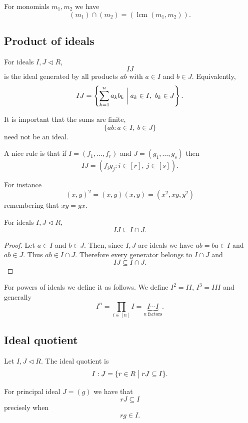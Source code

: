 \documentclass[11pt]{article}
\begin{document}
For monomials $m_1,m_2$ we have 
\[
    (m_1) \cap (m_2) = (\operatorname{lcm}(m_1,m_2)). 
\]

\subsection{Product of ideals}

\begin{defn}
    For ideals $I,J \triangleleft R$, 
    \[
        IJ
    \]
    is the ideal generated by all products $ab$ with $a \in I$ 
    and $b \in J$. 
    Equivalently, 
    \[
        IJ
        = 
        \left\{
            \sum_{k=1}^n a_kb_k \biggm| a_k \in I, \ b_k \in J
        \right\}.
    \]  
\end{defn}
It is important that the sums are finite, 
\[
    \{ab : a \in I, \ b \in J\}
\]
need not be an ideal. 

A nice rule is that if $I = (f_1,\ldots,f_r)$ and 
$J = (g_1,\ldots,g_s)$ then 
\[
    IJ = (f_ig_j : i \in [r], \ j \in [s]). 
\]

For instance 
\[
    (x,y)^2 = (x,y)(x,y) = (x^2, xy, y^2)
\]
remembering that $xy = yx$. 

\begin{prop}
    For ideals $I,J \triangleleft R$, 
    \[
        IJ \subseteq I \cap J. 
    \]
\end{prop}
\begin{proof}
    Let $a \in I$ and $b \in J$. Then, since $I,J$ are ideals 
    we have $ab = ba \in I$ and $ab \in J$. Thus 
    $ab \in I \cap J$. Therefore every generator belongs to 
    $I \cap J$ and 
    \[
        IJ \subseteq I \cap J.
    \]
\end{proof}

For powers of ideals we define it as follows. 
We define $I^2 = II$, $I^3 = III$ and generally 
\[
    I^n = \prod_{i\in[n]} I = 
    \underbrace{I\cdots I}_{n \ \text{factors}}.
\]

\subsection{Ideal quotient}

\begin{defn}
    Let $I,J \triangleleft R$. The ideal quotient is 
    \[
        I : J = \{r \in R \bigm| rJ \subseteq I\}. 
    \]
\end{defn}
For principal ideal $J = (g)$ we have that 
\[
    rJ \subseteq I
\]
precisely when 
\[
    rg \in I. 
\]
\end{document}
